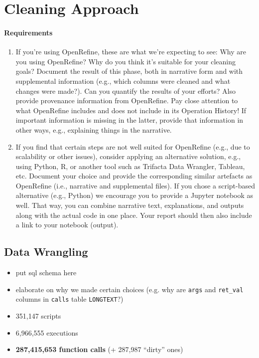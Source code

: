 \section{Cleaning Approach}
\paragraph{Requirements}
\begin{enumerate}[label=\alph*.,nolistsep]
	\item If you're using OpenRefine, these are what we're expecting to see: Why are you using OpenRefine? Why do you think it's suitable for your cleaning goals? Document the result of this phase, both in narrative form and with supplemental information (e.g., which columns were cleaned and what changes were made?). Can you quantify the results of your efforts? Also provide provenance information from OpenRefine. Pay close attention to what OpenRefine includes and does not include in its Operation History! If important information is missing in the latter, provide that information in other ways, e.g., explaining things in the narrative.
	\item If you find that certain steps are not well suited for OpenRefine (e.g., due to scalability or other issues), consider applying an alternative solution, e.g., using Python, R, or another tool such as Trifacta Data Wrangler, Tableau, etc. Document your choice and provide the corresponding similar artefacts as OpenRefine (i.e., narrative and supplemental files). If you chose a script-based alternative (e.g., Python) we encourage you to provide a Jupyter notebook as well. That way, you can combine narrative text, explanations, and outputs along with the actual code in one place. Your report should then also include a link to your notebook (output).
\end{enumerate}

\subsection{Data Wrangling}
\begin{itemize}[nolistsep]
	\item put sql schema here
	\item elaborate on why we made certain choices (e.g. why are \texttt{args} and \texttt{ret\_val} columns in \texttt{calls} table \texttt{LONGTEXT}?)
	\item 351,147 scripts
	\item 6,966,555 executions
	\item \textbf{287,415,653 function calls} (+ 287,987 ``dirty'' ones)
\end{itemize}

